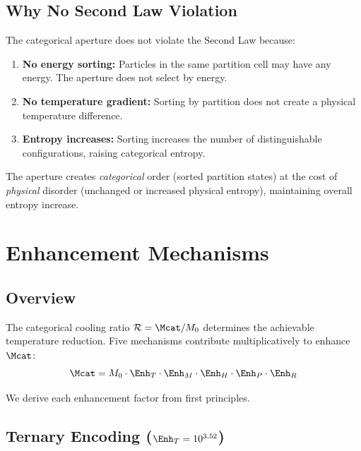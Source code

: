 \subsection{Why No Second Law Violation}

The categorical aperture does not violate the Second Law because:

\begin{enumerate}
    \item \textbf{No energy sorting:} Particles in the same partition cell may have any energy. The aperture does not select by energy.

    \item \textbf{No temperature gradient:} Sorting by partition does not create a physical temperature difference.

    \item \textbf{Entropy increases:} Sorting increases the number of distinguishable configurations, raising categorical entropy.
\end{enumerate}

The aperture creates \textit{categorical} order (sorted partition states) at the cost of \textit{physical} disorder (unchanged or increased physical entropy), maintaining overall entropy increase.

\section{Enhancement Mechanisms}

\subsection{Overview}

The categorical cooling ratio $\mathcal{R} = \Mcat/M_0$ determines the achievable temperature reduction. Five mechanisms contribute multiplicatively to enhance $\Mcat$:
\begin{equation}
\Mcat = M_0 \cdot \Enh_T \cdot \Enh_M \cdot \Enh_H \cdot \Enh_P \cdot \Enh_R
\label{eq:total_enhancement}
\end{equation}

We derive each enhancement factor from first principles.

\subsection{Ternary Encoding ($\Enh_T = 10^{3.52}$)}

